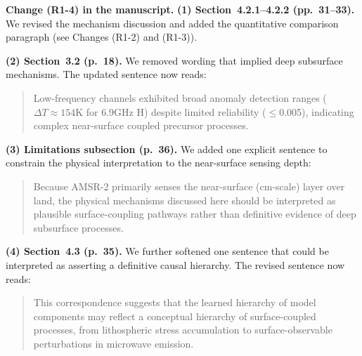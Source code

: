 \documentclass[11pt]{article}
\newcommand{\revchange}[1]{\begingroup\color{changecolor}#1\endgroup}
\begin{document}
\revchange{%
\textbf{Change (R1-4) in the manuscript.}
\textbf{(1) Section~4.2.1--4.2.2 (pp.~31--33).} We revised the mechanism discussion and added the quantitative comparison paragraph (see Changes (R1-2) and (R1-3)).

\medskip

\textbf{(2) Section~3.2 (p.~18).} We removed wording that implied deep subsurface mechanisms. The updated sentence now reads:
\begin{quote}
Low-frequency channels exhibited broad anomaly detection ranges ($\Delta T \approx 154$K for 6.9GHz H) despite limited reliability ($\le$0.005), indicating complex near-surface coupled precursor processes.
\end{quote}

\medskip

\textbf{(3) Limitations subsection (p.~36).} We added one explicit sentence to constrain the physical interpretation to the near-surface sensing depth:
\begin{quote}
Because AMSR-2 primarily senses the near-surface (cm-scale) layer over land, the physical mechanisms discussed here should be interpreted as plausible surface-coupling pathways rather than definitive evidence of deep subsurface processes.
\end{quote}

\medskip

\textbf{(4) Section~4.3 (p.~35).} We further softened one sentence that could be interpreted as asserting a definitive causal hierarchy. The revised sentence now reads:
\begin{quote}
This correspondence suggests that the learned hierarchy of model components may reflect a conceptual hierarchy of surface-coupled processes, from lithospheric stress accumulation to surface-observable perturbations in microwave emission.
\end{quote}
}
\end{document}
